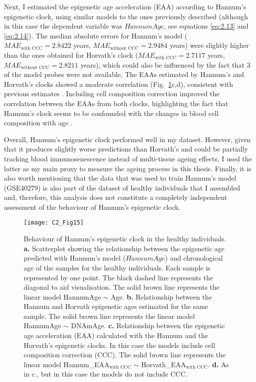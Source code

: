\bigskip

Next, I estimated the epigenetic age acceleration (EAA) according to Hannum's epigenetic clock, using similar models to the ones previously described (although in this case the dependent variable was $HannumAge$, see equations \ref{eq:2.13} and \ref{eq:2.14}). The median absolute errors for Hannum's model ($MAE_{\text{with CCC}} = 2.8422$ years, $MAE_{\text{without CCC}} = 2.9484$ years) were slightly higher than the ones obtained for Horvath's clock ($MAE_{\text{with CCC}} = 2.7117$ years, $MAE_{\text{without CCC}} = 2.8211$ years), which could also be influenced by the fact that 3 of the model probes were not available. The EAAs estimated by Hannum's and Horvath's clocks showed a moderate correlation (Fig.~\ref{fig:c2_fig15}c,d), consistent with previous estimates \cite{Irvin2018}. Including cell composition correction improved the correlation between the EAAs from both clocks, highlighting the fact that Hannum's clock seems to be confounded with the changes in blood cell composition with age \cite{Marioni2015,Irvin2018}. 

\bigskip

Overall, Hannum's epigenetic clock performed well in my dataset. However, given that it produces slightly worse predictions than Horvath's and could be partially tracking blood immunosenescence instead of multi-tissue ageing effects, I used the latter as my main proxy to measure the ageing process in this thesis. Finally, it is also worth mentioning that the data that was used to train Hannum's model (GSE40279) is also part of the dataset of healthy individuals that I assembled and, therefore, this analysis does not constitute a completely independent assessment of the behaviour of Hannum's epigenetic clock.


\begin{figure}[htbp!] 
	\centering
	\texttt{[image: C2\_Fig15]}
	\vspace*{2mm}    
	\caption[Behaviour of Hannum's epigenetic clock in the healthy individuals]{Behaviour of Hannum's epigenetic clock in the healthy individuals. \textbf{a.} Scatterplot showing the relationship between the epigenetic age predicted with Hannum's model ($HannumAge$) \cite{Hannum2013} and chronological age of the samples for the healthy individuals. Each sample is represented by one point. The black dashed line represents the diagonal to aid visualisation. The solid brown line represents the linear model HannumAge $\sim$ Age. \textbf{b.} Relationship between the Hannum and Horvath epigenetic ages estimated for the same sample. The solid brown line represents the linear model HannumAge $\sim$ DNAmAge. \textbf{c.} Relationship between the epigenetic age acceleration (EAA) calculated with the Hannum and the Horvath's epigenetic clocks. In this case the models include cell composition correction (CCC). The solid brown line represents the linear model Hannum\_EAA$_{\text{with CCC}}$ $\sim$ Horvath\_EAA$_{\text{with CCC}}$. \textbf{d.} As in c., but in this case the models do not include CCC.}
	\label{fig:c2_fig15}
\end{figure}



